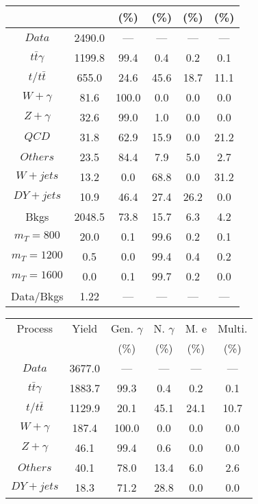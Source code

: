 \begin{figure}
\begin{minipage}[c]{0.32\textwidth}
{\begin{tabular}{cccccc}
 &  & (\%) & (\%) & (\%) & (\%)  \\
\hline
                                                                      $ Data $ &  2490.0 &  --- &  --- &  --- &  ---\\
$ t\bar{t}\gamma $ &  1199.8 &  99.4 &  0.4 &  0.2 &  0.1\\
$ t/t\bar{t} $ &  655.0 &  24.6 &  45.6 &  18.7 &  11.1\\
$ W+\gamma $ &  81.6 &  100.0 &  0.0 &  0.0 &  0.0\\
$ Z+\gamma $ &  32.6 &  99.0 &  1.0 &  0.0 &  0.0\\
$ QCD $ &  31.8 &  62.9 &  15.9 &  0.0 &  21.2\\
$ Others $ &  23.5 &  84.4 &  7.9 &  5.0 &  2.7\\
$ W+jets $ &  13.2 &  0.0 &  68.8 &  0.0 &  31.2\\
$ DY+jets $ &  10.9 &  46.4 &  27.4 &  26.2 &  0.0\\
Bkgs &  2048.5 &  73.8 &  15.7 &  6.3 &  4.2\\
$ m_{T} = 800 $ &  20.0 &  0.1 &  99.6 &  0.2 &  0.1\\
$ m_{T} = 1200 $ &  0.5 &  0.0 &  99.4 &  0.4 &  0.2\\
$ m_{T} = 1600 $ &  0.0 &  0.1 &  99.7 &  0.2 &  0.0\\
Data/Bkgs &  1.22 &  --- &  --- &  --- &  ---\\
\hline
\end{tabular}
}
\end{minipage}
\begin{minipage}[c]{0.32\textwidth}
\centering
\tiny{
\begin{tabular}{cccccc}
\hline
Process & Yield & Gen. $\gamma$ & N. $\gamma$ & M. e & Multi. \\
 &  & (\%) & (\%) & (\%) & (\%)  \\
\hline
                                                                      $ Data $ &  3677.0 &  --- &  --- &  --- &  ---\\
$ t\bar{t}\gamma $ &  1883.7 &  99.3 &  0.4 &  0.2 &  0.1\\
$ t/t\bar{t} $ &  1129.9 &  20.1 &  45.1 &  24.1 &  10.7\\
$ W+\gamma $ &  187.4 &  100.0 &  0.0 &  0.0 &  0.0\\
$ Z+\gamma $ &  46.1 &  99.4 &  0.6 &  0.0 &  0.0\\
$ Others $ &  40.1 &  78.0 &  13.4 &  6.0 &  2.6\\
$ DY+jets $ &  18.3 &  71.2 &  28.8 &  0.0 &  0.0\\

\end{tabular}}
\end{minipage}
\end{figure}
